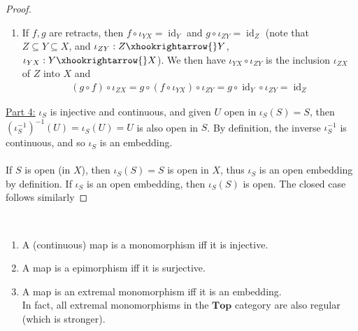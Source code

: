 \documentclass{treatise}
\begin{document}
\begin{proof}
\begin{enumerate}[label=(\alph*)]
    \item If $f, g$ are retracts, then $f \circ \iota_{YX} = \operatorname{id}_Y$ and $g \circ \iota_{ZY} = \operatorname{id}_Z$ (note that $Z \subseteq Y \subseteq X$, and $\iota_{ZY} : Z \xhookrightarrow{} Y$, $\iota_{YX} : Y \xhookrightarrow{} X$). We then have $\iota_{YX} \circ \iota_{ZY}$ is the inclusion $\iota_{ZX}$ of $Z$ into $X$ and
    \begin{align*}
        (g \circ f) \circ \iota_{ZX} = g \circ (f \circ \iota_{YX}) \circ \iota_{ZY} = g \circ \operatorname{id}_Y \circ \iota_{ZY} = \operatorname{id}_Z
    \end{align*}
\end{enumerate}
\underline{Part 4:} $\iota_S$ is injective and continuous, and given $U$ open in $\iota_S (S) = S$, then $(\iota_S^{-1})^{-1}(U) = \iota_S (U) = U$ is also open in $S$. By definition, the inverse $\iota_S^{-1}$ is continuous, and so $\iota_S$ is an embedding.
\\
\\
If $S$ is open (in $X$), then $\iota_S (S) = S$ is open in $X$, thus $\iota_S$ is an open embedding by definition. If $\iota_S$ is an open embedding, then $\iota_S (S)$ is open. The closed case follows similarly
\end{proof}
\begin{proposition} \ 
\begin{enumerate}
    \item A (continuous) map is a monomorphism iff it is injective.
    \item A map is a epimorphism iff it is surjective.
    \item A map is an extremal monomorphism iff it is an embedding.
    \\
    In fact, all extremal monomorphisms in the $\mathbf{Top}$ category are also regular (which is stronger).
\end{enumerate}
\end{proposition}
\end{document}
